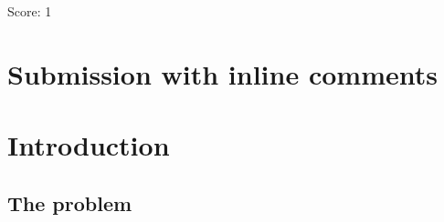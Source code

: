 \documentclass[11pt]{article}
\theoremstyle{remark}
\newcommand{\U}{U_q}
\newcommand{\slN}{\mathfrak{sl}_n}
\newcommand{\bp}{\mathfrak b_+}
\newcommand{\bm}{\mathfrak b_-}
\newcommand{\redS}{\overline{\mathcal S}_n}
\newcommand{\Bstar}{\mathfrak B^*}
\newcommand{\cD}{\mathcal D}
\begin{document}
\noindent Score: 1


\newpage
\section{Submission with inline comments}


\begin{abstract}
We construct an explicit algebra isomorphism between the generalized
quantum double $\cD=\U(\bm)\bowtie\U(\bp)$ of the Borel subalgebras of
the simply-connected $\U(\slN)$, for the Drinfeld--Tanisaki skew
pairing, and the reduced stated $SL_n$-skein algebra $\redS(\Bstar)$ of
a bigon with one interior puncture: the two families of horizontal arcs
of $\Bstar$ become a lower and an upper triangular quantum matrix, whose
diagonal entries generate the two copies of the weight torus and whose
off-diagonal entries are root vectors up to toral factors. We deduce
that $\U(\slN)$ is the quotient of $\redS(\Bstar)$ by the relations
$b_{aa}c_{aa}=1$ between the diagonal entries.
For $n=2$ both statements are due to Korinman. The proof combines the
L\^e--Sikora factorization of stated skein algebras with the
Faddeev--Reshetikhin--Takhtajan realization of quantum Borel algebras
by triangular quantum matrices, with all normalizations made explicit.
\end{abstract}

\section{Introduction}

\subsection{The problem}
\end{document}
